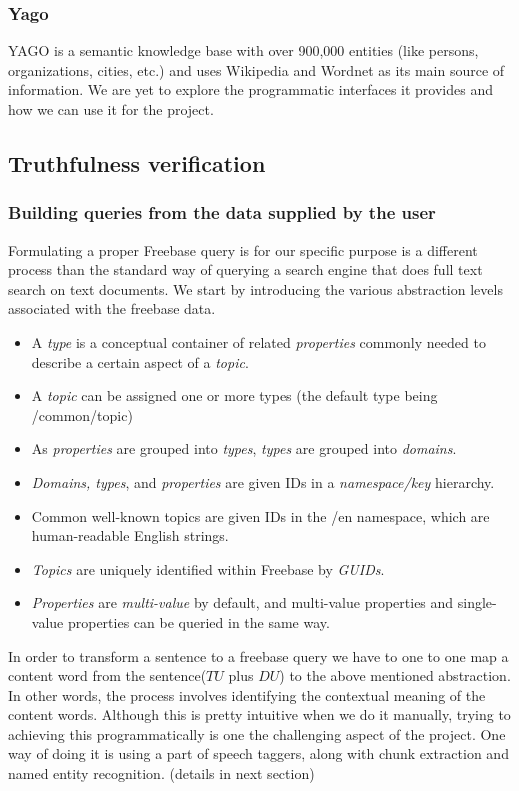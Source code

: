 \documentclass[11pt]{article}
\begin{document}
\subsubsection{Yago}
YAGO is a semantic knowledge base with over 900,000 entities (like persons,
organizations, cities, etc.) and uses Wikipedia and Wordnet as its main source of
information. We are yet to explore the programmatic interfaces it provides and
how we can use it for the project.


\subsection{Truthfulness verification }
\subsubsection {Building queries from the data supplied by the user}

Formulating a proper Freebase query is for our specific purpose is a different process than the standard way of querying a search engine that does full text search on text documents. We start by introducing the  various abstraction levels associated with the freebase data.
\begin{itemize}
    \item  A {\em type} is a conceptual container of related {\em properties} commonly needed to describe a certain aspect of a {\em topic}.
    \item  A {\em topic} can be assigned one or more types (the default type being /common/topic)
    \item  As {\em properties} are grouped into {\em types}, {\em types} are grouped into {\em domains}.
    \item  {\em Domains, types}, and {\em properties} are given IDs in a {\em namespace/key} hierarchy.
    \item  Common well-known topics are given IDs in the /en namespace, which are human-readable English strings.
    \item  {\em Topics} are uniquely identified within Freebase by {\em GUIDs}.
    \item  {\em Properties} are {\em multi-value} by default, and multi-value properties and single-value properties can be queried in the same way.
\end{itemize}
In order to transform a sentence to a freebase query we have to one to one map a content word from the sentence($TU$ plus $DU$) to the above mentioned abstraction. In other words, the process involves identifying the contextual meaning of the content words. Although this is pretty intuitive when we do it manually, trying to achieving this programmatically is one the challenging aspect of the project. One way of doing it is using a part of speech taggers, along with chunk extraction and named entity recognition. (details in next section) 
\end{document}
